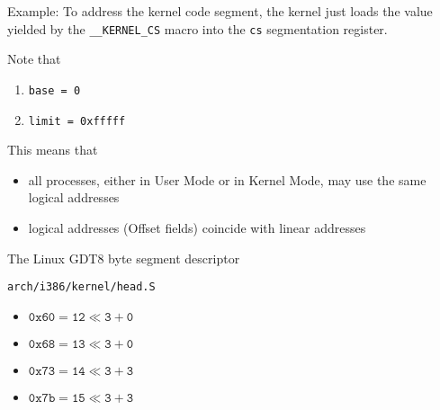 \begin{frame}
  \begin{block}{Example:}
    To address the kernel code segment, the kernel just loads the value yielded by the
    {\texttt{\_\_KERNEL\_CS}} macro into the {\texttt{cs}} segmentation register.
  \end{block}
  \begin{block}{Note that}
    \begin{enumerate}
    \item \texttt{base = 0}
    \item \texttt{limit = 0xfffff}
    \end{enumerate}
    This means that
    \begin{itemize}
    \item all processes, either in User Mode or in Kernel Mode, may use the same
      logical addresses
    \item logical addresses (Offset fields) coincide with linear addresses
    \end{itemize}
  \end{block}
\end{frame}
  
\begin{frame}{The Linux GDT}{8 byte segment descriptor}
  \begin{center}
  \end{center}
  \begin{block}{\texttt{arch/i386/kernel/head.S}}
    \begin{center}
    \end{center}
  \end{block}
\end{frame}

\begin{multicols}{2}
  \begin{itemize}
  \item $\mathtt{0x60 = 12 \ll 3 + 0}$
  \item $\mathtt{0x68 = 13 \ll 3 + 0}$
  \item $\mathtt{0x73 = 14 \ll 3 + 3}$
  \item $\mathtt{0x7b = 15 \ll 3 + 3}$
  \end{itemize}
\end{multicols}

